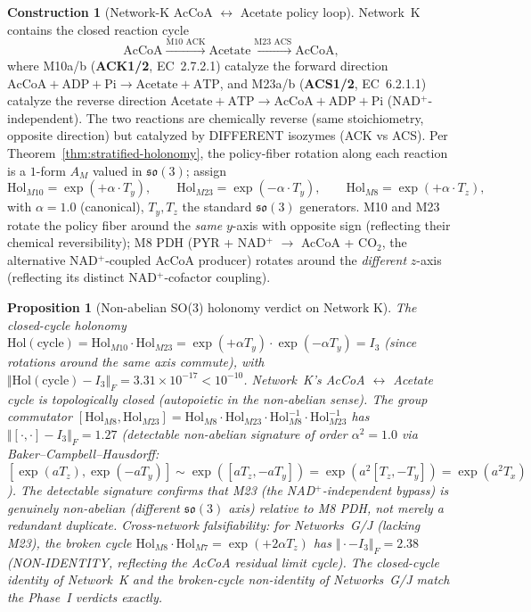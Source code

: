 \documentclass[11pt,a4paper]{article}
\theoremstyle{plain}
\newtheorem{proposition}[theorem]{Proposition}
\theoremstyle{definition}
\newtheorem{construction}[theorem]{Construction}
\theoremstyle{remark}
\newcommand{\so}{\mathfrak{so}}
\newcommand{\normF}[1]{\mathopen{}\Vert#1\mathclose{}\Vert_{\!F}}
\begin{document}
\begin{construction}[Network-K AcCoA $\leftrightarrow$ Acetate policy loop]
\label{con:netK-accoa-cycle}
Network~K contains the closed reaction cycle
\[
\text{AcCoA} \xrightarrow{\text{M10 ACK}} \text{Acetate}
\xrightarrow{\text{M23 ACS}} \text{AcCoA},
\]
where M10a/b (\textbf{ACK1/2}, EC~2.7.2.1) catalyze the forward
direction $\text{AcCoA} + \text{ADP} + \text{Pi} \to \text{Acetate}
+ \text{ATP}$, and M23a/b (\textbf{ACS1/2}, EC~6.2.1.1) catalyze
the reverse direction $\text{Acetate} + \text{ATP} \to \text{AcCoA}
+ \text{ADP} + \text{Pi}$ (NAD$^+$-independent). The two reactions
are chemically reverse (same stoichiometry, opposite direction)
but catalyzed by DIFFERENT isozymes (ACK vs ACS). Per
Theorem~\ref{thm:stratified-holonomy}, the policy-fiber rotation
along each reaction is a $1$-form $A_M$ valued in $\so(3)$; assign
\[
\mathrm{Hol}_{M10} = \exp(+\alpha \cdot T_y), \qquad
\mathrm{Hol}_{M23} = \exp(-\alpha \cdot T_y), \qquad
\mathrm{Hol}_{M8}  = \exp(+\alpha \cdot T_z),
\]
with $\alpha = 1.0$ (canonical), $T_y, T_z$ the standard $\so(3)$
generators. M10 and M23 rotate the policy fiber around the
\emph{same} $y$-axis with opposite sign (reflecting their chemical
reversibility); M8 PDH (PYR + NAD$^+$ $\to$ AcCoA + CO$_2$, the
alternative NAD$^+$-coupled AcCoA producer) rotates around the
\emph{different} $z$-axis (reflecting its distinct NAD$^+$-cofactor
coupling).
\end{construction}

\begin{proposition}[Non-abelian SO(3) holonomy verdict on Network K]
\label{prop:netK-so3}
The closed-cycle holonomy
$\mathrm{Hol}(\mathrm{cycle}) = \mathrm{Hol}_{M10} \cdot
\mathrm{Hol}_{M23} = \exp(+\alpha T_y) \cdot \exp(-\alpha T_y) = I_3$
(since rotations around the same axis commute), with
$\normF{\mathrm{Hol}(\mathrm{cycle}) - I_3} = 3.31 \times 10^{-17} <
10^{-10}$. Network~K's AcCoA $\leftrightarrow$ Acetate cycle is
\emph{topologically closed} (autopoietic in the non-abelian sense).
The group commutator
$[\mathrm{Hol}_{M8}, \mathrm{Hol}_{M23}] = \mathrm{Hol}_{M8} \cdot
\mathrm{Hol}_{M23} \cdot \mathrm{Hol}_{M8}^{-1} \cdot
\mathrm{Hol}_{M23}^{-1}$ has $\normF{[\cdot, \cdot] - I_3} = 1.27$
(detectable non-abelian signature of order $\alpha^2 = 1.0$ via
Baker--Campbell--Hausdorff: $[\exp(a T_z), \exp(-a T_y)] \sim
\exp([a T_z, -a T_y]) = \exp(a^2 [T_z, -T_y]) = \exp(a^2 T_x)$).
The detectable signature confirms that M23 (the NAD$^+$-independent
bypass) is genuinely non-abelian (different $\so(3)$ axis) relative
to M8 PDH, not merely a redundant duplicate. Cross-network
falsifiability: for Networks~G/J (lacking M23), the broken cycle
$\mathrm{Hol}_{M8} \cdot \mathrm{Hol}_{M7} = \exp(+2\alpha T_z)$
has $\normF{\cdot - I_3} = 2.38$ (NON-IDENTITY, reflecting the
AcCoA residual limit cycle). The closed-cycle identity of Network~K
and the broken-cycle non-identity of Networks~G/J match the Phase~I
verdicts exactly.
\end{proposition}
\end{document}
